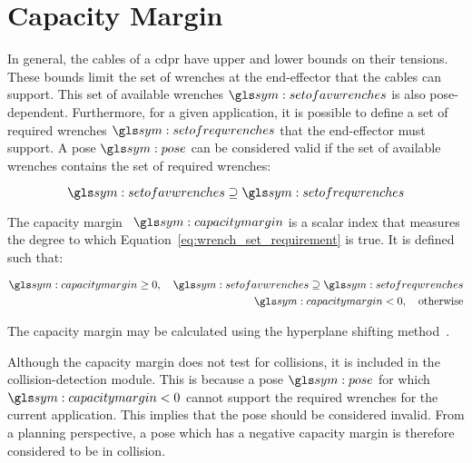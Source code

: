 \section{Capacity Margin}%
\label{sec:capacity_margin}

	In general, the cables of a \gls{cdpr} have upper and lower bounds on their
	tensions. These bounds limit the set of wrenches at the end-effector that
	the cables can support. This set of available wrenches $\setofavwrenches$ is
	also pose-dependent. Furthermore, for a given application, it is possible to
	define a set of required wrenches $\setofreqwrenches$ that the end-effector
	must support. A pose $\pose$ can be considered valid if the set of available
	wrenches contains the set of required wrenches:

	\begin{equation}
		\setofavwrenches \supseteq \setofreqwrenches
		\label{eq:wrench_set_requirement}
	\end{equation}

	The capacity
	margin~\cite{bib:cdpr:measuring_how_well_a_structure_supports_varying_external_wrenches}
	$\capacitymargin$ is a scalar index that measures the
	degree to which Equation~\ref{eq:wrench_set_requirement} is true. It is
	defined such that:

	\begin{align}
		\begin{split}
			\capacitymargin \geq 0, \quad \setofavwrenches \supseteq \setofreqwrenches \\
			\capacitymargin < 0, \quad \text{otherwise}
		\end{split}
	\end{align}

	The capacity margin may be calculated using the hyperplane shifting
	method~\cite{bib:cdpr:on_the_ability_of_a_cable_driven_robot_to_generate_a_prescribed_set_of_wrenches}.


	Although the capacity margin does not test for collisions, it is included in
	the collision-detection module. This is because a pose $\pose$ for which
	$\capacitymargin < 0$ cannot support the required wrenches for the current
	application. This implies that the pose should be considered invalid. From a
	planning perspective, a pose which has a negative capacity margin is
	therefore considered to be in collision.
